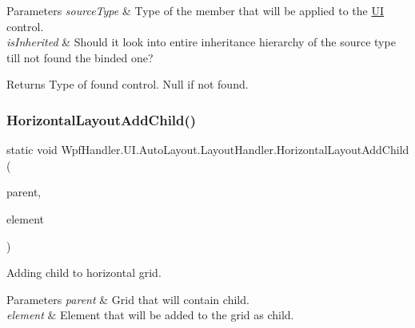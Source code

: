 \begin{DoxyParams}{Parameters}
{\em source\+Type} & Type of the member that will be applied to the \mbox{\hyperlink{namespace_wpf_handler_1_1_u_i}{UI}} control.\\
\hline
{\em is\+Inherited} & Should it look into entire inheritance hierarchy of the source type till not found the binded one?\\
\hline
\end{DoxyParams}
\begin{DoxyReturn}{Returns}
Type of found control. Null if not found.
\end{DoxyReturn}
\mbox{\label{class_wpf_handler_1_1_u_i_1_1_auto_layout_1_1_layout_handler_af450dc0f251144cbdb3c64c4756c8025}} 
\subsubsection{\texorpdfstring{Horizontal\+Layout\+Add\+Child()}{HorizontalLayoutAddChild()}}
{\footnotesize\ttfamily static void Wpf\+Handler.\+U\+I.\+Auto\+Layout.\+Layout\+Handler.\+Horizontal\+Layout\+Add\+Child (\begin{DoxyParamCaption}\item[{I\+Add\+Child}]{parent,  }\item[{Framework\+Element}]{element }\end{DoxyParamCaption})\hspace{0.3cm}{\ttfamily [static]}}



Adding child to horizontal grid. 


\begin{DoxyParams}{Parameters}
{\em parent} & Grid that will contain child.\\
\hline
{\em element} & Element that will be added to the grid as child.\\
\hline
\end{DoxyParams}
\mbox{\label{class_wpf_handler_1_1_u_i_1_1_auto_layout_1_1_layout_handler_a2ae3e871977ebeaed8c265ccf98e46a9}} 
